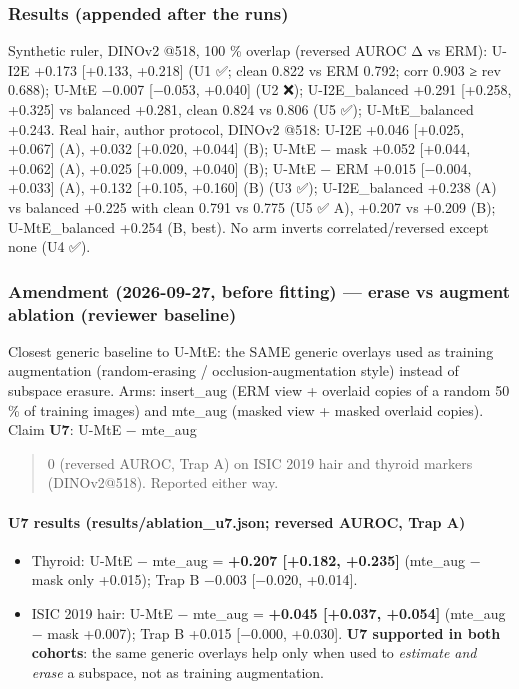 {\subsubsection{Results (appended after the runs)}\label{results-appended-after-the-runs}

Synthetic ruler, DINOv2 @518, 100 \% overlap (reversed AUROC Δ vs ERM): U-I2E +0.173 {[}+0.133, +0.218{]} (U1 ✅;
clean 0.822 vs ERM 0.792; corr 0.903 ≥ rev 0.688); U-MtE −0.007 {[}−0.053, +0.040{]} (U2 ❌); U-I2E\_balanced +0.291
{[}+0.258, +0.325{]} vs balanced +0.281, clean 0.824 vs 0.806 (U5 ✅); U-MtE\_balanced +0.243.
Real hair, author protocol, DINOv2 @518: U-I2E +0.046 {[}+0.025, +0.067{]} (A), +0.032 {[}+0.020, +0.044{]} (B);
U-MtE − mask +0.052 {[}+0.044, +0.062{]} (A), +0.025 {[}+0.009, +0.040{]} (B); U-MtE − ERM +0.015 {[}−0.004, +0.033{]} (A),
+0.132 {[}+0.105, +0.160{]} (B) (U3 ✅); U-I2E\_balanced +0.238 (A) vs balanced +0.225 with clean 0.791 vs 0.775 (U5 ✅ A),
+0.207 vs +0.209 (B); U-MtE\_balanced +0.254 (B, best). No arm inverts correlated/reversed except none (U4 ✅).

\subsubsection{Amendment (2026-09-27, before fitting) --- erase vs augment ablation (reviewer baseline)}\label{amendment-2026-09-27-before-fitting--erase-vs-augment-ablation-reviewer-baseline}

Closest generic baseline to U-MtE: the SAME generic overlays used as training augmentation (random-erasing /
occlusion-augmentation style) instead of subspace erasure. Arms: insert\_aug (ERM view + overlaid copies of a
random 50 \% of training images) and mte\_aug (masked view + masked overlaid copies). Claim \textbf{U7}: U-MtE − mte\_aug

\begin{quote}
0 (reversed AUROC, Trap A) on ISIC 2019 hair and thyroid markers (DINOv2@518). Reported either way.
\end{quote}

\paragraph{U7 results (results/ablation\_u7.json; reversed AUROC, Trap A)}\label{u7-results-resultsablation_u7json-reversed-auroc-trap-a}

\begin{itemize}

\item
  Thyroid: U-MtE − mte\_aug = \textbf{+0.207 {[}+0.182, +0.235{]}} (mte\_aug − mask only +0.015); Trap B −0.003 {[}−0.020, +0.014{]}.
\item
  ISIC 2019 hair: U-MtE − mte\_aug = \textbf{+0.045 {[}+0.037, +0.054{]}} (mte\_aug − mask +0.007); Trap B +0.015 {[}−0.000, +0.030{]}.
  \textbf{U7 supported in both cohorts}: the same generic overlays help only when used to \emph{estimate and erase} a
  subspace, not as training augmentation.
\end{itemize}

}
